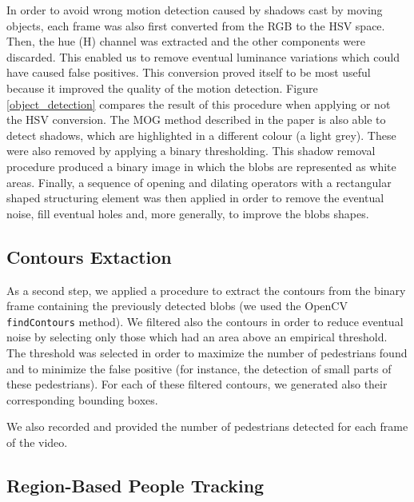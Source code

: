 \documentclass[runningheads]{llncs}
\begin{document}
In order to avoid wrong motion detection caused by shadows cast by moving objects, each frame was also first converted from the RGB to the HSV space. Then, the hue (H) channel was extracted and the other components were discarded. This enabled us to remove eventual luminance variations which could have caused false positives.
This conversion proved itself to be most useful because it improved the quality of the motion detection. Figure \ref{object_detection} compares the result of this procedure when applying or not the HSV conversion.
The MOG method described in the paper is also able to detect shadows, which are highlighted in a different colour (a light grey). These were also removed by applying a binary thresholding. This shadow removal procedure produced a binary image in which the blobs are represented as white areas. 
Finally,  a sequence of opening and dilating operators with a rectangular shaped structuring element was then applied in order to remove the eventual noise, fill eventual holes and, more generally, to improve the blobs shapes.
\smallskip

\subsection{Contours Extaction}
As a second step, we applied a procedure to extract the contours from the binary frame containing the previously detected blobs (we used the OpenCV \texttt{findContours} \cite{findcontours} method). We filtered also the contours in order to reduce eventual noise by selecting only those which had an area above an empirical threshold. The threshold was selected in order to maximize the number of pedestrians found and to minimize the false positive (for instance, the detection of small parts of these pedestrians).  For each of these filtered contours, we generated also their corresponding bounding boxes.

We also recorded and provided the number of pedestrians detected for each frame of the video. 


\subsection{Region-Based People Tracking}
\end{document}
